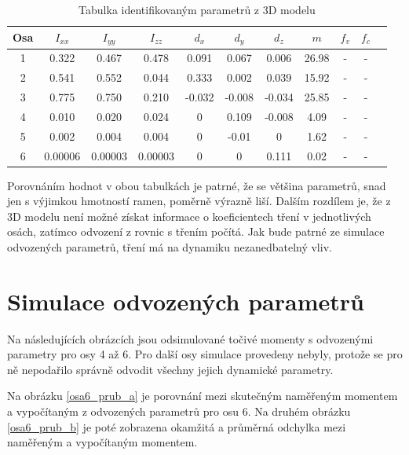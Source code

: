 \begin{table}[htbp]
  \centering
  \caption{Tabulka identifikovaným parametrů z 3D modelu}
    \begin{tabular}{c|cccccccccc}
    \multicolumn{1}{c|}{Osa} & \multicolumn{1}{c}{$I_{xx}$} & \multicolumn{1}{c}{$I_{yy}$} & \multicolumn{1}{c}{$I_{zz}$} & \multicolumn{1}{c}{$d_x$} & \multicolumn{1}{c}{$d_y$} & \multicolumn{1}{c}{$d_z$} & \multicolumn{1}{c}{$m$} & \multicolumn{1}{c}{$f_v$} & \multicolumn{1}{c}{$f_c$} \\
    \hline
    1  & 0.322   & 0.467   & 0.478   & 0.091 & 0.067 & 0.006 & 26.98 & - & - \\
    2  & 0.541   & 0.552   & 0.044   & 0.333 & 0.002 & 0.039 & 15.92 & - & - \\
    3  & 0.775   & 0.750   & 0.210   &-0.032 &-0.008 &-0.034 & 25.85 & - & - \\
    4  & 0.010   & 0.020   & 0.024   & 0     & 0.109 &-0.008 & 4.09  & - & - \\
    5  & 0.002   & 0.004   & 0.004   & 0     &-0.01  & 0     & 1.62  & - & - \\
    6  & 0.00006 & 0.00003 & 0.00003 & 0     & 0     & 0.111 & 0.02  & - & - \\
    \end{tabular}%
  \label{tab_ind_hodnot_3d}%
\end{table}%

Porovnáním hodnot v obou tabulkách je patrné, že se většina parametrů, snad jen s výjimkou hmotností ramen, poměrně výrazně liší. Dalším rozdílem je, že z 3D modelu není možné získat informace o koeficientech tření v jednotlivých osách, zatímco odvození z rovnic s třením počítá. Jak bude patrné ze simulace odvozených parametrů, tření má na dynamiku nezanedbatelný vliv.

\section{Simulace odvozených parametrů}

Na následujících obrázcích jsou odsimulované točivé momenty s odvozenými parametry pro osy 4 až 6. Pro další osy simulace provedeny nebyly, protože se pro ně nepodařilo správně odvodit všechny jejich dynamické parametry.

Na obrázku \ref{osa6_prub_a} je porovnání mezi skutečným naměřeným momentem a vypočítaným z odvozených parametrů pro osu 6. Na druhém obrázku \ref{osa6_prub_b} je poté zobrazena okamžitá a průměrná odchylka mezi naměřeným a vypočítaným momentem. 

